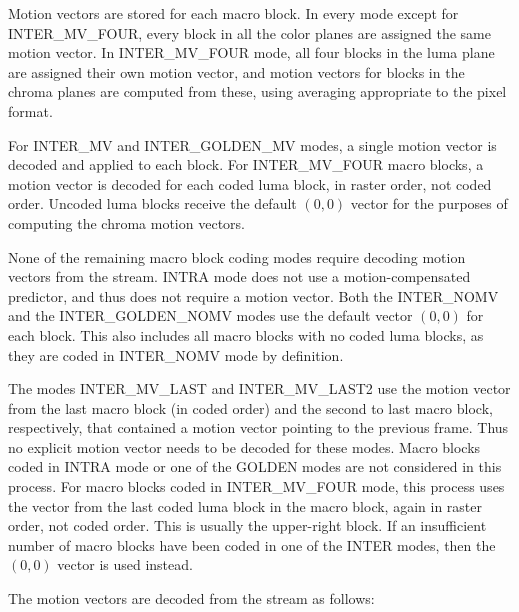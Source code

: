 \documentclass[9pt,letterpaper]{book}
\numberwithin{equation}{chapter}
\numberwithin{figure}{chapter}
\numberwithin{table}{chapter}
\begin{document}
Motion vectors are stored for each macro block.
In every mode except for INTER\_MV\_FOUR, every block in all the color planes
 are assigned the same motion vector.
In INTER\_MV\_FOUR mode, all four blocks in the luma plane are assigned their
 own motion vector, and motion vectors for blocks in the chroma planes are
 computed from these, using averaging appropriate to the pixel format.

For INTER\_MV and INTER\_GOLDEN\_MV modes, a single motion vector is decoded
 and applied to each block.
For INTER\_MV\_FOUR macro blocks, a motion vector is decoded for each coded
 luma block, in raster order, not coded order.
Uncoded luma blocks receive the default $(0,0)$ vector for the purposes of
 computing the chroma motion vectors.

None of the remaining macro block coding modes require decoding motion vectors
 from the stream.
INTRA mode does not use a motion-compensated predictor, and thus does not
 require a motion vector.
Both the INTER\_NOMV and the INTER\_GOLDEN\_NOMV modes use the default
 vector $(0,0)$ for each block.
This also includes all macro blocks with no coded luma blocks, as they are
 coded in INTER\_NOMV mode by definition.

The modes INTER\_MV\_LAST and INTER\_MV\_LAST2 use the motion vector from the
 last macro block (in coded order) and the second to last macro block,
 respectively, that contained a motion vector pointing to the previous frame.
Thus no explicit motion vector needs to be decoded for these modes.
Macro blocks coded in INTRA mode or one of the GOLDEN modes are not considered
 in this process.
For macro blocks coded in INTER\_MV\_FOUR mode, this process uses the vector
 from the last coded luma block in the macro block, again in raster order, not
 coded order.
This is usually the upper-right block.
If an insufficient number of macro blocks have been coded in one of the INTER
 modes, then the $(0,0)$ vector is used instead.

The motion vectors are decoded from the stream as follows:
\end{document}
